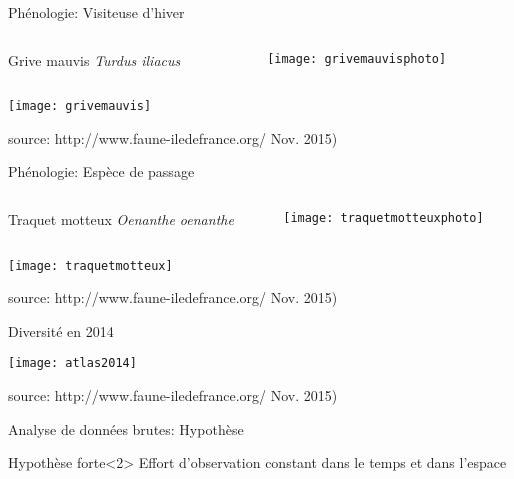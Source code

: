 \documentclass[10pt]{beamer}
\begin{document}
\begin{frame}{Phénologie: Visiteuse d'hiver}
 \begin{columns}
    \begin{column}[c]{0.7\textwidth}
   Grive mauvis \textit{Turdus iliacus}
    \end{column}
    \begin{column}[c]{0.30\textwidth}
     \begin{center}
        \texttt{[image: grivemauvisphoto]}
  \end{center}
    \end{column}
  \end{columns}
    \begin{center}
        \texttt{[image: grivemauvis]}
  \end{center}
  \footnotesize{source: http://www.faune-iledefrance.org/ Nov. 2015)}
\end{frame}



\begin{frame}{Phénologie: Espèce de passage}
 \begin{columns}
    \begin{column}[c]{0.7\textwidth}
   Traquet motteux \textit{Oenanthe oenanthe}
    \end{column}
    \begin{column}[c]{0.30\textwidth}
     \begin{center}
        \texttt{[image: traquetmotteuxphoto]}
  \end{center}
    \end{column}
  \end{columns}
    \begin{center}
        \texttt{[image: traquetmotteux]}
  \end{center}
  \footnotesize{source: http://www.faune-iledefrance.org/ Nov. 2015)}
\end{frame}


\begin{frame}{Diversité en 2014}
     \begin{center}
        \texttt{[image: atlas2014]}
  \end{center}
  \footnotesize{source: http://www.faune-iledefrance.org/ Nov. 2015)}
\end{frame}


\begin{frame}{Analyse de données brutes: Hypothèse}
     \begin{block}{Hypothèse forte}<2>
     Effort d'observation constant dans le temps et dans l'espace
     \end{block}
\end{frame}
\end{document}
